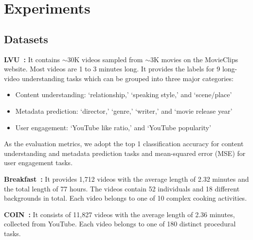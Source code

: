 \documentclass{article}
\begin{document}
\vspace{-0.2cm}
\section{Experiments}
\vspace{-0.2cm}
\label{sec:exp}
\subsection{Datasets}

\noindent\textbf{LVU~\citep{wu2021lvu}:} It contains $\sim$30K videos sampled from $\sim$3K movies on the MovieClips~\citep{movieclip} website. Most videos are 1 to 3 minutes long. It provides the labels for 9 long-video understanding tasks which can be grouped into three major categories: 
\begin{itemize}[align=parleft,left=10pt..1em, leftmargin=*]\vspace{-0.15cm}
\itemsep0em
    \item Content understanding: `relationship,' `speaking style,' and `scene/place'
    \item Metadata prediction: `director,' `genre,' `writer,' and `movie release year'
    \item User engagement: `YouTube like ratio,' and `YouTube popularity'
\end{itemize} \vspace{-0.15cm}
As the evaluation metrics, we adopt the top 1 classification accuracy for content understanding and metadata prediction tasks and mean-squared error (MSE) for user engagement tasks.

\vspace{-0.1cm}
\noindent\textbf{Breakfast~\citep{kuehne2014breakfast}:} It provides 1,712 videos  with the average length of 2.32 minutes and the total length of 77 hours. The videos contain 52 individuals and 18 different backgrounds in total. Each video belongs to one of 10 complex cooking activities.

\vspace{-0.1cm}
\noindent\textbf{COIN~\citep{tang2019coin}:} It consists of 11,827 videos with the average length of 2.36 minutes, collected from YouTube. Each video belongs to one of 180 distinct procedural tasks. 
\end{document}
